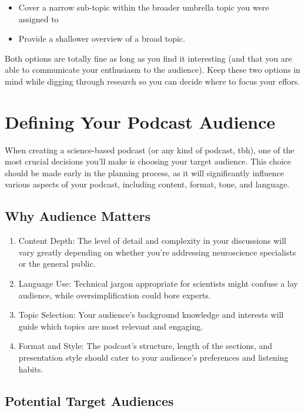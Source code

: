\documentclass[
  letterpaper,
  DIV=11,
  numbers=noendperiod]{scrreprt}
\providecommand{\tightlist}{%
  \setlength{\itemsep}{0pt}\setlength{\parskip}{0pt}}\usepackage{longtable,booktabs,array}
\begin{document}
\begin{itemize}
\tightlist
\item
  Cover a narrow sub-topic within the broader umbrella topic you were
  assigned to
\item
  Provide a shallower overview of a broad topic.
\end{itemize}

Both options are totally fine as long as you find it interesting (and
that you are able to communicate your enthusiasm to the audience). Keep
these two options in mind while digging through research so you can
decide where to focus your effors.

\section{Defining Your Podcast
Audience}\label{defining-your-podcast-audience}

When creating a science-based podcast (or any kind of podcast, tbh), one
of the most crucial decisions you'll make is choosing your target
audience. This choice should be made early in the planning process, as
it will significantly influence various aspects of your podcast,
including content, format, tone, and language.

\subsection{Why Audience Matters}\label{why-audience-matters}

\begin{enumerate}
\def\labelenumi{\arabic{enumi}.}
\item
  Content Depth: The level of detail and complexity in your discussions
  will vary greatly depending on whether you're addressing neuroscience
  specialists or the general public.
\item
  Language Use: Technical jargon appropriate for scientists might
  confuse a lay audience, while oversimplification could bore experts.
\item
  Topic Selection: Your audience's background knowledge and interests
  will guide which topics are most relevant and engaging.
\item
  Format and Style: The podcast's structure, length of the sections, and
  presentation style should cater to your audience's preferences and
  listening habits.
\end{enumerate}

\subsection{Potential Target
Audiences}\label{potential-target-audiences}
\end{document}
